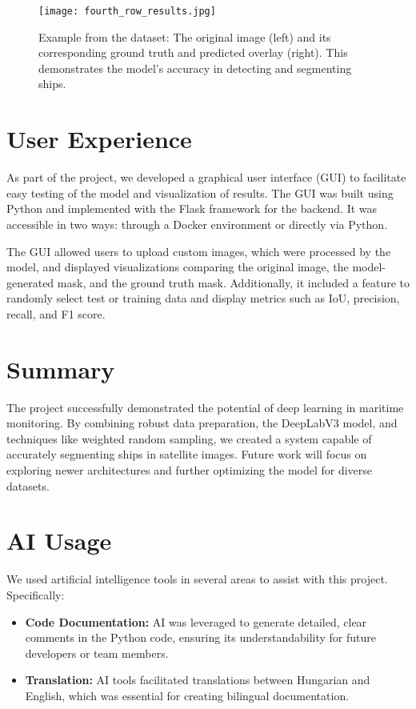 \documentclass{article}
\begin{document}
\begin{figure}[h]
    \centering
    \texttt{[image: fourth\_row\_results.jpg]}
    \caption{Example from the dataset: The original image (left) and its corresponding ground truth and predicted overlay (right). This demonstrates the model's accuracy in detecting and segmenting ships.}
    \label{fig:fourth_row_example}
\end{figure}

\section{User Experience}

As part of the project, we developed a graphical user interface (GUI) to facilitate easy testing of the model and visualization of results. The GUI was built using Python and implemented with the Flask framework for the backend. It was accessible in two ways: through a Docker environment or directly via Python.

The GUI allowed users to upload custom images, which were processed by the model, and displayed visualizations comparing the original image, the model-generated mask, and the ground truth mask. Additionally, it included a feature to randomly select test or training data and display metrics such as IoU, precision, recall, and F1 score.

\section{Summary}

The project successfully demonstrated the potential of deep learning in maritime monitoring. By combining robust data preparation, the DeepLabV3 model, and techniques like weighted random sampling, we created a system capable of accurately segmenting ships in satellite images. Future work will focus on exploring newer architectures and further optimizing the model for diverse datasets.

\section{AI Usage}

We used artificial intelligence tools in several areas to assist with this project. Specifically:
\begin{itemize}
    \item \textbf{Code Documentation:} AI was leveraged to generate detailed, clear comments in the Python code, ensuring its understandability for future developers or team members.
    \item \textbf{Translation:} AI tools facilitated translations between Hungarian and English, which was essential for creating bilingual documentation.
\end{itemize}
\end{document}
